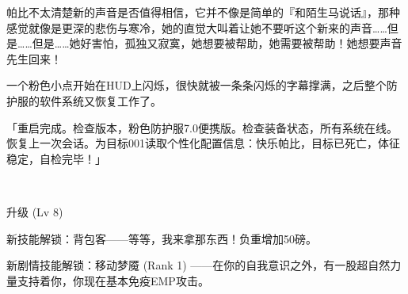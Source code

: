 帕比不太清楚新的声音是否值得相信，它并不像是简单的『和陌生马说话』，那种感觉就像是更深的悲伤与寒冷，她的直觉大叫着让她不要听这个新来的声音……但是……但是……她好害怕，孤独又寂寞，她想要被帮助，她需要被帮助！她想要声音先生回来！


一个粉色小点开始在HUD上闪烁，很快就被一条条闪烁的字幕撑满，之后整个防护服的软件系统又恢复工作了。

「{\mt 重启完成。检查版本，粉色防护服7.0便携版。检查装备状态，所有系统在线。恢复上一次会话。为目标001读取个性化配置信息：快乐帕比，目标已死亡，体征稳定，自检完毕！}」

~\vfill

\begin{note}
    升级 (Lv 8) 

    新技能解锁：背包客——等等，我来拿那东西！负重增加50磅。

    新剧情技能解锁：移动梦魇 (Rank 1) ——在你的自我意识之外，有一股超自然力量支持着你，你现在基本免疫EMP攻击。
\end{note}


